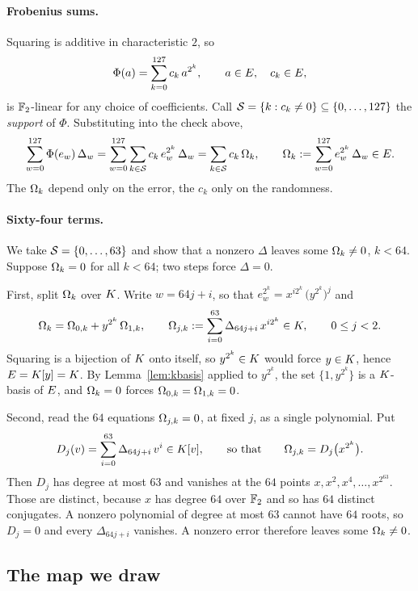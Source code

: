 \paragraph{Frobenius sums.} Squaring is additive in characteristic $2$, so
\[
\Phi(a)=\sum_{k=0}^{127}c_k\,a^{2^k},\qquad a\in E,\quad c_k\in E,
\]
is $\mathbb{F}_2$-linear for any choice of coefficients. Call $\mathcal{S}=\{k:c_k\neq0\}\subseteq\{0,\dots,127\}$ the \emph{support} of $\Phi$. Substituting into the check above,
\begin{equation}
\sum_{w=0}^{127}\Phi(e_w)\,\Delta_w=\sum_{w=0}^{127}\sum_{k\in\mathcal{S}}c_k\,e_w^{2^k}\,\Delta_w=\sum_{k\in\mathcal{S}}c_k\,\Omega_k,
\qquad
\Omega_k:=\sum_{w=0}^{127}e_w^{2^k}\,\Delta_w\in E.
\label{eq:pairing}
\end{equation}
The $\Omega_k$ depend only on the error, the $c_k$ only on the randomness.

\paragraph{Sixty-four terms.} We take $\mathcal{S}=\{0,\dots,63\}$ and show that a nonzero $\Delta$ leaves some $\Omega_k\neq0$, $k<64$. Suppose $\Omega_k=0$ for all $k<64$; two steps force $\Delta=0$.

First, split $\Omega_k$ over $K$. Write $w=64j+i$, so that $e_w^{2^k}=x^{i2^k}\,\bigl(y^{2^k}\bigr)^{j}$ and
\[
\Omega_k=\Omega_{0,k}+y^{2^k}\,\Omega_{1,k},
\qquad
\Omega_{j,k}:=\sum_{i=0}^{63}\Delta_{64j+i}\,x^{i2^k}\in K,\qquad 0\le j<2.
\]
Squaring is a bijection of $K$ onto itself, so $y^{2^k}\in K$ would force $y\in K$, hence $E=K[y]=K$. By Lemma~\ref{lem:kbasis} applied to $y^{2^k}$, the set $\bigl\{1,y^{2^k}\bigr\}$ is a $K$-basis of $E$, and $\Omega_k=0$ forces $\Omega_{0,k}=\Omega_{1,k}=0$.

Second, read the $64$ equations $\Omega_{j,k}=0$, at fixed $j$, as a single polynomial. Put
\[
D_j(v)=\sum_{i=0}^{63}\Delta_{64j+i}\,v^i\in K[v],
\qquad\text{so that}\qquad
\Omega_{j,k}=D_j\bigl(x^{2^k}\bigr).
\]
Then $D_j$ has degree at most $63$ and vanishes at the $64$ points $x,x^2,x^4,\dots,x^{2^{63}}$. Those are distinct, because $x$ has degree $64$ over $\mathbb{F}_2$ and so has $64$ distinct conjugates. A nonzero polynomial of degree at most $63$ cannot have $64$ roots, so $D_j=0$ and every $\Delta_{64j+i}$ vanishes. A nonzero error therefore leaves some $\Omega_k\neq0$.

\subsection{The map we draw}\label{rs:map}

